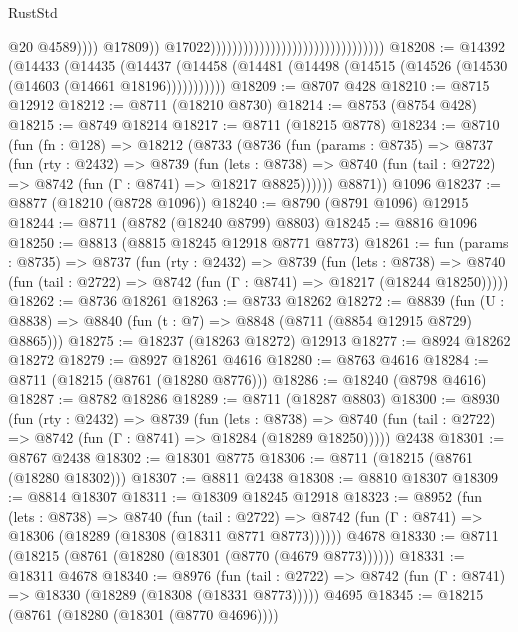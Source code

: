 \begin{lexlean}{RustStd}
\begin{coremodule}
                                                                                @20
                                                                                @4589))))
                                                                        @17809))
                                                                    @17022))))))))))))))))))))))))))))))))
@18208 := @14392
    (@14433
      (@14435
        (@14437 (@14458 (@14481 (@14498 (@14515 (@14526 (@14530 (@14603 (@14661 @18196)))))))))))
@18209 := @8707 @428
@18210 := @8715 @12912
@18212 := @8711 (@18210 @8730)
@18214 := @8753 (@8754 @428)
@18215 := @8749 @18214
@18217 := @8711 (@18215 @8778)
@18234 := @8710
    (fun (fn : @128) =>
    @18212
      (@8733
        (@8736
          (fun (params : @8735) =>
          @8737
            (fun (rty : @2432) =>
            @8739
              (fun (lets : @8738) =>
              @8740 (fun (tail : @2722) => @8742 (fun (Γ : @8741) => @18217 @8825))))))
        @8871))
    @1096
@18237 := @8877 (@18210 (@8728 @1096))
@18240 := @8790 (@8791 @1096) @12915
@18244 := @8711 (@8782 (@18240 @8799) @8803)
@18245 := @8816 @1096
@18250 := @8813 (@8815 @18245 @12918 @8771 @8773)
@18261 := fun (params : @8735) =>
  @8737
    (fun (rty : @2432) =>
    @8739
      (fun (lets : @8738) =>
      @8740 (fun (tail : @2722) => @8742 (fun (Γ : @8741) => @18217 (@18244 @18250)))))
@18262 := @8736 @18261
@18263 := @8733 @18262
@18272 := @8839
    (fun (U : @8838) => @8840 (fun (t : @7) => @8848 (@8711 (@8854 @12915 @8729) @8865)))
@18275 := @18237 (@18263 @18272) @12913
@18277 := @8924 @18262 @18272
@18279 := @8927 @18261 @4616
@18280 := @8763 @4616
@18284 := @8711 (@18215 (@8761 (@18280 @8776)))
@18286 := @18240 (@8798 @4616)
@18287 := @8782 @18286
@18289 := @8711 (@18287 @8803)
@18300 := @8930
    (fun (rty : @2432) =>
    @8739
      (fun (lets : @8738) =>
      @8740 (fun (tail : @2722) => @8742 (fun (Γ : @8741) => @18284 (@18289 @18250)))))
    @2438
@18301 := @8767 @2438
@18302 := @18301 @8775
@18306 := @8711 (@18215 (@8761 (@18280 @18302)))
@18307 := @8811 @2438
@18308 := @8810 @18307
@18309 := @8814 @18307
@18311 := @18309 @18245 @12918
@18323 := @8952
    (fun (lets : @8738) =>
    @8740
      (fun (tail : @2722) =>
      @8742 (fun (Γ : @8741) => @18306 (@18289 (@18308 (@18311 @8771 @8773))))))
    @4678
@18330 := @8711 (@18215 (@8761 (@18280 (@18301 (@8770 (@4679 @8773))))))
@18331 := @18311 @4678
@18340 := @8976
    (fun (tail : @2722) => @8742 (fun (Γ : @8741) => @18330 (@18289 (@18308 (@18331 @8773)))))
    @4695
@18345 := @18215 (@8761 (@18280 (@18301 (@8770 @4696))))

\end{coremodule}
\end{lexlean}
